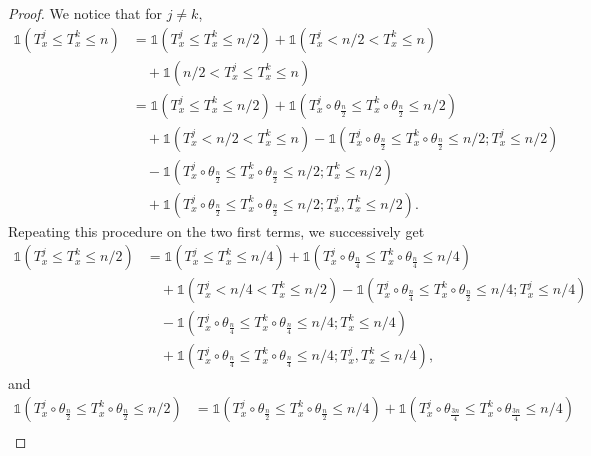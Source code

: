 \documentclass[12pt]{article}
\newcommand{\1}{\mathds{1}}
\numberwithin{equation}{section}
\begin{document}
\begin{proof}
    We notice that for $j\ne k$,
    \begin{align*}
        \1\left(T_x^j\le T_x^k\le n\right)&=\1\left(T_x^j\le T_x^k\le n/2\right)+\1\left(T_x^j<n/2<T_x^k\le n\right)\\
        &\hspace{1em}+\1\left(n/2<T_x^j\le T_x^k\le n\right)\\
        &=\1\left(T_x^j\le T_x^k\le n/2\right)+\1\left(T_x^j\circ\theta_{\frac n2}\le T_x^k\circ\theta_{\frac n2}\le n/2\right)\\
        &\hspace{1em}+\1\left(T_x^j<n/2<T_x^k\le n\right)-\1\left(T_x^j\circ\theta_{\frac n2}\le T_x^k\circ\theta_{\frac n2}\le n/2; T_x^j\le n/2\right)\\
        &\hspace{1em}-\1\left(T_x^j\circ\theta_{\frac n2}\le T_x^k\circ\theta_{\frac n2}\le n/2; T_x^k\le n/2\right)\\
        &\hspace{1em}+\1\left(T_x^j\circ\theta_{\frac n2}\le T_x^k\circ\theta_{\frac n2}\le n/2; T_x^j,T_x^k\le n/2\right).
    \end{align*}
    Repeating this procedure on the two first terms, we successively get
    \begin{align*}
        \1\left(T_x^j\le T_x^k\le n/2\right)&=\1\left(T_x^j\le T_x^k\le n/4\right)+\1\left(T_x^j\circ\theta_{\frac n4}\le T_x^k\circ\theta_{\frac n4}\le n/4\right)\\
        &\hspace{1em}+\1\left(T_x^j<n/4<T_x^k\le n/2\right)-\1\left(T_x^j\circ\theta_{\frac n4}\le T_x^k\circ\theta_{\frac n2}\le n/4; T_x^j\le n/4\right)\\
        &\hspace{1em}-\1\left(T_x^j\circ\theta_{\frac n4}\le T_x^k\circ\theta_{\frac n4}\le n/4; T_x^k\le n/4\right)\\
        &\hspace{1em}+\1\left(T_x^j\circ\theta_{\frac n4}\le T_x^k\circ\theta_{\frac n4}\le n/4; T_x^j,T_x^k\le n/4\right),
    \end{align*}
    and
    \begin{align*}
        \1\left(T_x^j\circ\theta_{\frac n2}\le T_x^k\circ\theta_{\frac n2}\le n/2\right)&=\1\left(T_x^j\circ\theta_{\frac n2}\le T_x^k\circ\theta_{\frac n2}\le n/4\right)+\1\left(T_x^j\circ\theta_{\frac {3n}4}\le T_x^k\circ\theta_{\frac{3n}4}\le n/4\right)\\

\end{align*}
\end{proof}
\end{document}

